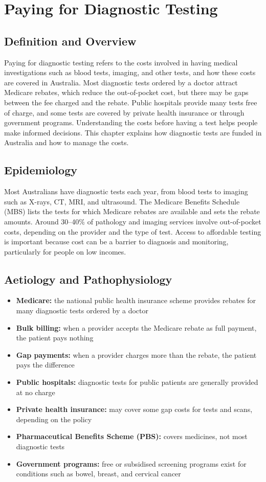\chapter{Paying for Diagnostic Testing}

\section*{Definition and Overview}
Paying for diagnostic testing refers to the costs involved in having medical investigations such as blood tests, imaging, and other tests, and how these costs are covered in Australia. Most diagnostic tests ordered by a doctor attract Medicare rebates, which reduce the out-of-pocket cost, but there may be gaps between the fee charged and the rebate. Public hospitals provide many tests free of charge, and some tests are covered by private health insurance or through government programs. Understanding the costs before having a test helps people make informed decisions. This chapter explains how diagnostic tests are funded in Australia and how to manage the costs.

\section*{Epidemiology}
Most Australians have diagnostic tests each year, from blood tests to imaging such as X-rays, CT, MRI, and ultrasound. The Medicare Benefits Schedule (MBS) lists the tests for which Medicare rebates are available and sets the rebate amounts. Around 30--40\% of pathology and imaging services involve out-of-pocket costs, depending on the provider and the type of test. Access to affordable testing is important because cost can be a barrier to diagnosis and monitoring, particularly for people on low incomes.

\section*{Aetiology and Pathophysiology}
\begin{itemize}
    \item \textbf{Medicare:} the national public health insurance scheme provides rebates for many diagnostic tests ordered by a doctor
    \item \textbf{Bulk billing:} when a provider accepts the Medicare rebate as full payment, the patient pays nothing
    \item \textbf{Gap payments:} when a provider charges more than the rebate, the patient pays the difference
    \item \textbf{Public hospitals:} diagnostic tests for public patients are generally provided at no charge
    \item \textbf{Private health insurance:} may cover some gap costs for tests and scans, depending on the policy
    \item \textbf{Pharmaceutical Benefits Scheme (PBS):} covers medicines, not most diagnostic tests
    \item \textbf{Government programs:} free or subsidised screening programs exist for conditions such as bowel, breast, and cervical cancer
\end{itemize}

